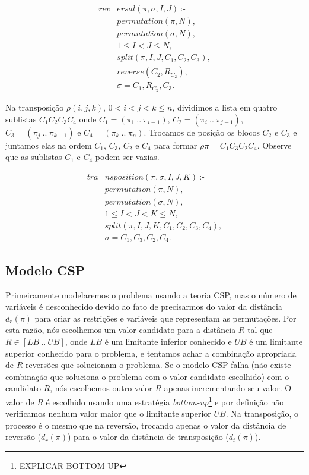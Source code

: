 \begin{align}
  \label{reversal}
  \textit{rev}&\textit{ersal}(\pi, \sigma, I, J)~\text{:-} \nonumber\\
  &\textit{permutation}(\pi, N), \nonumber\\
  &\textit{permutation}(\sigma, N), \nonumber \\
  &1 \le I < J \le N, \\
  &\textit{split}(\pi, I, J, C_{1}, C_{2}, C_{3}), \nonumber\\
  &\textit{reverse}(C_{2}, R_{C_{2}}), \nonumber \\
  &\sigma = C_{1}, R_{C_{2}}, C_{3}. \nonumber
\end{align}

Na transposição $\rho(i,j,k)$, $0 < i < j < k\leq n$, dividimos a
lista em quatro sublistas $C_{1}C_{2}C_{3}C_{4}$ onde $C_{1} =
(\pi_{1}~..~\pi_{i-1})$, $C_{2} = (\pi_{i}~..~\pi_{j-1})$, $C_{3} =
(\pi_{j}~..~\pi_{k-1})$ e $C_{4} = (\pi_{k}~..~\pi_{n})$. Trocamos de
posição os blocos $C_{2}$ e $C_{3}$ e juntamos elas na ordem $C_{1}$,
$C_{3}$, $C_{2}$ e $C_{4}$ para formar $\rho\pi =
C_{1}C_{3}C_{2}C_{4}$. Observe que as sublistas $C_{1}$ e $C_{4}$
podem ser vazias.

\begin{align}
  \label{transposition}
  \textit{tra}&\textit{nsposition}(\pi, \sigma, I, J, K)~\text{:-} \nonumber\\
  &\textit{permutation}(\pi, N), \nonumber\\
  &\textit{permutation}(\sigma, N), \\
  &1 \le I < J < K \le N, \nonumber \\
  &\textit{split}(\pi, I, J, K, C_{1}, C_{2}, C_{3}, C_{4}), \nonumber\\
  &\sigma = C_{1}, C_{3}, C_{2}, C_{4}. \nonumber
\end{align}

\subsection{Modelo CSP}
\label{modelcsp}
Primeiramente modelaremos o problema usando a teoria CSP, mas o número
de variáveis é desconhecido devido ao fato de precisarmos do valor da
distância $d_{r}(\pi)$ para criar as restrições e variáveis que
representam as permutações. Por esta razão, nós escolhemos um valor
candidato para a distância $R$ tal que $R \in [LB~..~UB]$, onde $LB$ é
um limitante inferior conhecido e $UB$ é um limitante superior
conhecido para o problema, e tentamos achar a combinação apropriada de
$R$ reversões que solucionam o problema. Se o modelo CSP falha (não
existe combinação que soluciona o problema com o valor candidato
escolhido) com o candidato $R$, nós escolhemos outro valor $R$ apenas
incrementando seu valor. O valor de $R$ é escolhido usando uma
estratégia \textit{bottom-up}\footnote{EXPLICAR BOTTOM-UP} e por
definição não verificamos nenhum valor maior que o limitante superior
$UB$. Na transposição, o processo é o mesmo que na reversão, trocando
apenas o valor da distância de reversão ($d_{r}(\pi)$) para o valor da
distância de transposição ($d_{t}(\pi)$).

